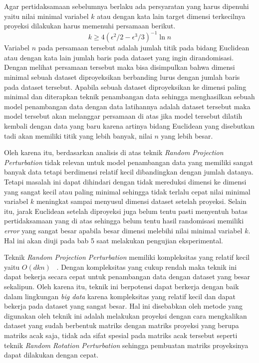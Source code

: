 Agar pertidaksamaan sebelumnya berlaku ada persyaratan yang harus dipenuhi yaitu nilai minimal variabel \(k\) atau dengan kata lain target dimensi terkecilnya proyeksi dilakukan harus memenuhi persamaan berikut.
\begin{equation}
	k \geq 4(\epsilon^{2}/2-\epsilon^{3}/3)^{-1}\ln{n}
\end{equation}
Variabel \(n\) pada persamaan tersebut adalah jumlah titik pada bidang Euclidean atau dengan kata lain jumlah baris pada dataset yang ingin dirandomisasi. Dengan melihat persamaan tersebut maka bisa disimpulkan bahwa dimensi minimal sebuah dataset diproyeksikan berbanding lurus dengan jumlah baris pada dataset tersebut. Apabila sebuah dataset diproyeksikan ke dimensi paling minimal dan diterapkan teknik penambangan data sehingga menghasilkan sebuah model penambangan data dengan data latihannya adalah dataset tersebut maka model tersebut akan melanggar persamaan di atas jika model tersebut dilatih kembali dengan data yang baru karena artinya bidang Euclidean yang disebutkan tadi akan memiliki titik yang lebih banyak, nilai \(n\) yang lebih besar. 

Oleh karena itu, berdasarkan analisis di atas teknik \textit{Random Projection Perturbation} tidak relevan untuk model penambangan data yang memiliki sangat banyak data tetapi berdimensi relatif kecil dibandingkan dengan jumlah datanya. Tetapi masalah ini dapat dihindari dengan tidak mereduksi dimensi ke dimensi yang sangat kecil atau paling minimal sehingga tidak terlalu cepat nilai minimal variabel \(k\) meningkat sampai menyusul dimensi dataset setelah proyeksi. Selain itu, jarak Euclidean setelah diproyeksi juga belum tentu pasti menyentuh batas pertidaksamaan yang di atas sehingga belum tentu hasil randomisasi memiliki \textit{error} yang sangat besar apabila besar dimensi melebihi nilai minimal variabel \(k\). Hal ini akan diuji pada bab 5 saat melakukan pengujian eksperimental.

Teknik \textit{Random Projection Perturbation} memiliki kompleksitas yang relatif kecil yaitu \(O(dkn)\) ~\cite{bingham:01:projection}. Dengan kompleksitas yang cukup rendah maka teknik ini dapat bekerja secara cepat untuk penambangan data dengan dataset yang besar sekalipun. Oleh karena itu, teknik ini berpotensi dapat berkerja dengan baik dalam lingkungan \textit{big data} karena kompleksitas yang relatif kecil dan dapat bekerja pada dataset yang sangat besar. Hal ini disebabkan oleh metode yang digunakan oleh teknik ini adalah melakukan proyeksi dengan cara mengkalikan dataset yang sudah berbentuk matriks dengan matriks proyeksi yang berupa matriks acak saja, tidak ada sifat spesial pada matriks acak tersebut seperti teknik \textit{Random Rotation Perturbation} sehingga pembuatan matriks proyeksinya dapat dilakukan dengan cepat.

